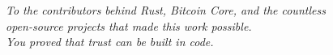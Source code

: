 \thispagestyle{empty}

\vspace*{3.5in}

\begin{center}
\begin{minipage}{0.65\textwidth}
  \centering
  {\large\itshape\color{chaptertitle}
    To the contributors behind Rust, Bitcoin Core, and the countless\\[0.5em]
    open-source projects that made this work possible.\\[0.5em]
    You proved that trust can be built in code.
  }
\end{minipage}
\end{center}

\vspace*{\fill}
\cleardoublepage
